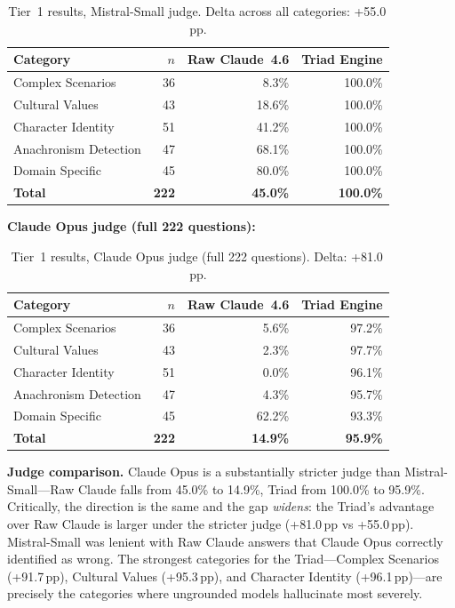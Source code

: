 \documentclass[11pt,a4paper]{article}
\begin{document}
\begin{table}[h]
\centering
\begin{tabular}{lrrr}
\toprule
Category & $n$ & Raw Claude~4.6 & Triad Engine \\
\midrule
Complex Scenarios     & 36  & 8.3\%  & 100.0\% \\
Cultural Values       & 43  & 18.6\% & 100.0\% \\
Character Identity    & 51  & 41.2\% & 100.0\% \\
Anachronism Detection & 47  & 68.1\% & 100.0\% \\
Domain Specific       & 45  & 80.0\% & 100.0\% \\
\midrule
\textbf{Total}        & \textbf{222} & \textbf{45.0\%} & \textbf{100.0\%} \\
\bottomrule
\end{tabular}
\caption{Tier~1 results, Mistral-Small judge. Delta across all categories: +55.0\,pp.}
\end{table}

\textbf{Claude Opus judge (full 222 questions):}

\begin{table}[h]
\centering
\begin{tabular}{lrrr}
\toprule
Category & $n$ & Raw Claude~4.6 & Triad Engine \\
\midrule
Complex Scenarios     & 36  & 5.6\%  & 97.2\% \\
Cultural Values       & 43  & 2.3\%  & 97.7\% \\
Character Identity    & 51  & 0.0\%  & 96.1\% \\
Anachronism Detection & 47  & 4.3\%  & 95.7\% \\
Domain Specific       & 45  & 62.2\% & 93.3\% \\
\midrule
\textbf{Total}        & \textbf{222} & \textbf{14.9\%} & \textbf{95.9\%} \\
\bottomrule
\end{tabular}
\caption{Tier~1 results, Claude Opus judge (full 222 questions). Delta: +81.0\,pp.}
\end{table}

\textbf{Judge comparison.} Claude Opus is a substantially stricter judge than
Mistral-Small---Raw Claude falls from 45.0\% to 14.9\%, Triad from 100.0\% to
95.9\%. Critically, the direction is the same and the gap \emph{widens}: the
Triad's advantage over Raw Claude is larger under the stricter judge
(+81.0\,pp vs +55.0\,pp). Mistral-Small was lenient with Raw Claude answers
that Claude Opus correctly identified as wrong. The strongest categories for
the Triad---Complex Scenarios (+91.7\,pp), Cultural Values (+95.3\,pp), and
Character Identity (+96.1\,pp)---are precisely the categories where ungrounded
models hallucinate most severely.
\end{document}
